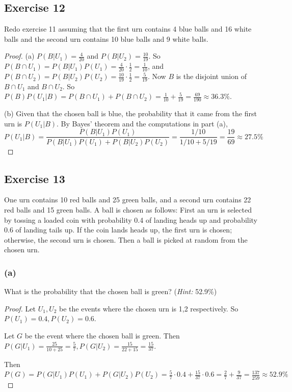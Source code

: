 \documentclass[14pt]{extarticle}
\begin{document}
\subsection{Exercise 12}
Redo exercise 11 assuming that the first urn contains 4 blue balls and 16 white balls and the second urn contains 10 blue
balls and 9 white balls.

\begin{proof}
     (a) \(P(B|U_1) = \frac{4}{20}\) and \(P(B|U_2) = \frac{10}{19}\). So \(P(B \cap U_1) = P(B|U_1)P(U_1) = \frac{4}{20} \cdot
     \frac{1}{2} = \frac{1}{10}\), and \(P(B \cap U_2) = P(B|U_2) P(U_2) = \frac{10}{19} \cdot \frac{1}{2} = \frac{5}{19}\). Now
     \(B\) is the disjoint union of \(B \cap U_1\) and \(B \cap U_2\). So \(P(B)P(U_1|B) = P(B \cap U_1) + P(B \cap U_2) =
     \frac{1}{10} + \frac{5}{19} = \frac{69}{190} \approx 36.3\%\).

     (b) Given that the chosen ball is blue, the probability that it came from the first urn is \(P(U_1|B)\). By Bayes’ theorem
     and the computations in part (a),
     \[
          P(U_1|B) = \frac{P(B|U_1)P(U_1)}{P(B|U_1)P(U_1) + P(B|U_2)P(U_2)} = \frac{1/10}{1/10 + 5/19} = \frac{19}{69}
          \approx 27.5\%
     \]
\end{proof}

\subsection{Exercise 13}
One urn contains 10 red balls and 25 green balls, and a second urn contains 22 red balls and 15 green balls. A ball is chosen
as follows: First an urn is selected by tossing a loaded coin with probability 0.4 of landing heads up and probability 0.6
of landing tails up. If the coin lands heads up, the first urn is chosen; otherwise, the second urn is chosen. Then a ball is
picked at random from the chosen urn.

\subsubsection{(a)}
What is the probability that the chosen ball is green? ({\it Hint:} 52.9\%)

\begin{proof}
     Let \(U_1, U_2\) be the events where the chosen urn is 1,2 respectively. So \(P(U_1) = 0.4, P(U_2) = 0.6 \).

     Let \(G\) be the event where the chosen ball is green. Then \(P(G|U_1) = \frac{25}{10+25} = \frac{5}{7}, P(G|U_2) =
     \frac{15}{22+15} = \frac{15}{37}\).

     Then \(P(G) = P(G|U_1)P(U_1) + P(G|U_2)P(U_2) = \frac{5}{7} \cdot 0.4 + \frac{15}{37} \cdot 0.6 = \frac{2}{7} + \frac{9}
     {37} = \frac{137}{259} \approx 52.9\%\)
\end{proof}
\end{document}
